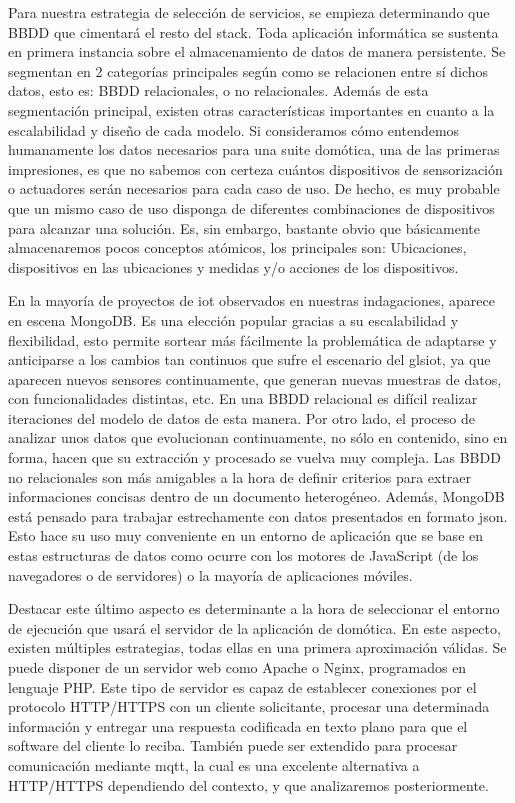 Para nuestra estrategia de selección de servicios, se empieza determinando que BBDD que cimentará el resto del stack. Toda aplicación informática se sustenta en primera instancia sobre el almacenamiento de datos de manera persistente. Se segmentan en 2 categorías principales según como se relacionen entre sí dichos datos, esto es: BBDD relacionales, o no relacionales. Además de esta segmentación principal, existen otras características importantes en cuanto a la escalabilidad y diseño de cada modelo. Si consideramos cómo entendemos humanamente los datos necesarios para una suite domótica, una de las primeras impresiones, es que no sabemos con certeza cuántos dispositivos de sensorización o actuadores serán necesarios para cada caso de uso. De hecho, es muy probable que un mismo caso de uso disponga de diferentes combinaciones de dispositivos para alcanzar una solución. Es, sin embargo, bastante obvio que básicamente almacenaremos pocos conceptos atómicos, los principales son: Ubicaciones, dispositivos en las ubicaciones y medidas y/o acciones de los dispositivos.

\vspace{1cm}

En la mayoría de proyectos de \gls{iot} observados en nuestras indagaciones, aparece en escena MongoDB. Es una elección popular gracias a su escalabilidad y flexibilidad, esto permite sortear más fácilmente la problemática de adaptarse y anticiparse a los cambios tan continuos que sufre el escenario del gls{iot}, ya que aparecen nuevos sensores continuamente, que generan nuevas muestras de datos, con funcionalidades distintas, etc. En una BBDD relacional es difícil realizar iteraciones del modelo de datos de esta manera. Por otro lado, el proceso de analizar unos datos que evolucionan continuamente, no sólo en contenido, sino en forma, hacen que su extracción y procesado se vuelva muy compleja. Las BBDD no relacionales son más amigables a la hora de definir criterios para extraer informaciones concisas dentro de un documento heterogéneo. Además, MongoDB está pensado para trabajar estrechamente con datos presentados en formato \gls{json}. Esto hace su uso muy conveniente en un entorno de aplicación que se base en estas estructuras de datos como ocurre con los motores de JavaScript (de los navegadores o de servidores) o la mayoría de aplicaciones móviles.

\vspace{1cm}

Destacar este último aspecto es determinante a la hora de seleccionar el entorno de ejecución que usará el servidor de la aplicación de domótica. En este aspecto, existen múltiples estrategias, todas ellas en una primera aproximación válidas. Se puede disponer de un servidor web como Apache o Nginx, programados en lenguaje PHP. Este tipo de servidor es capaz de establecer conexiones por el protocolo HTTP/HTTPS con un cliente solicitante, procesar una determinada información y entregar una respuesta codificada en texto plano para que el software del cliente lo reciba. También puede ser extendido para procesar comunicación mediante \gls{mqtt}, la cual es una excelente alternativa a HTTP/HTTPS dependiendo del contexto, y que analizaremos posteriormente.

